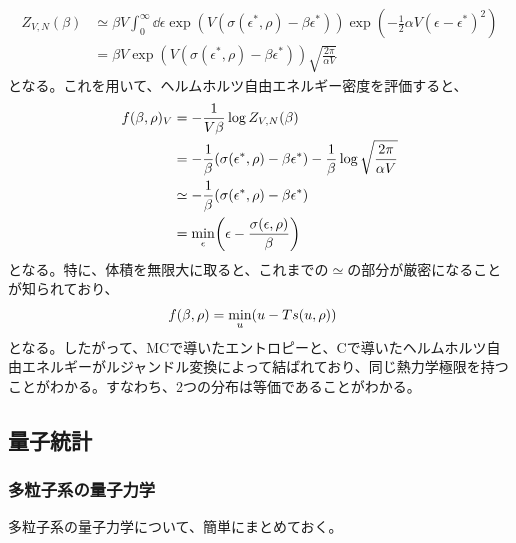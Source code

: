 \documentclass[a4paper,11pt]{jsarticle}
\numberwithin{equation}{section}
\begin{document}
\begin{align}
  Z_{V,N}(\beta) &\simeq \beta V \int_{0}^{\infty}\dd \epsilon \exp(V(\sigma(\epsilon^{*},\rho)-\beta \epsilon^{*})) \exp(-\frac{1}{2}\alpha V(\epsilon-\epsilon^{*})^2)\\
  &= \beta V \exp(V(\sigma(\epsilon^{*},\rho)-\beta \epsilon^{*}))\sqrt{\frac{2\pi}{\alpha V}}
\end{align}
となる。これを用いて、ヘルムホルツ自由エネルギー密度を評価すると、
\begin{align}
  f(\beta,\rho)_V &= -\frac{1}{V\beta}\log Z_{V,N}(\beta)\\
  &= -\frac{1}{\beta}(\sigma(\epsilon^{*},\rho) -\beta \epsilon^{*} ) -\frac{1}{\beta}\log \sqrt{\frac{2\pi}{\alpha V}}\\
  &\simeq -\frac{1}{\beta}(\sigma(\epsilon^{*},\rho) -\beta \epsilon^{*} ) \\
  &= \underset{\epsilon}{\min} \qty(\epsilon - \frac{\sigma(\epsilon,\rho)}{\beta})
\end{align}
となる。特に、体積を無限大に取ると、これまでの$\simeq$の部分が厳密になることが知られており、
\begin{align}
  f(\beta,\rho) &= \underset{u}{\min} \qty(u - Ts(u,\rho))
\end{align}
となる。したがって、MCで導いたエントロピーと、Cで導いたヘルムホルツ自由エネルギーがルジャンドル変換によって結ばれており、同じ熱力学極限を持つことがわかる。すなわち、2つの分布は等価であることがわかる。\hfill\qedsymbol\\







\subsection{量子統計}
\subsubsection{多粒子系の量子力学}
多粒子系の量子力学について、簡単にまとめておく。\\
\end{document}
